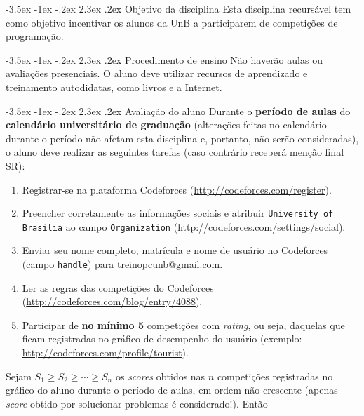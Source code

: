 \documentclass{UnBExam}%
\makeatletter
\newcommand{\numerocontests}{5}
\renewcommand\section{\@startsection{section}{1}{\z@}%
	{-3.5ex \@plus -1ex \@minus -.2ex}%
	{2.3ex \@plus.2ex}%
	{\normalfont\normalsize\bfseries}}%
\renewcommand{\indent}{\hspace{.5cm}}
\makeatother
\begin{document}
\section{Objetivo da disciplina}
\indent Esta disciplina recursável tem como objetivo incentivar os alunos da UnB a participarem de competições de programação.

\vspace{-.1cm}
\section{Procedimento de ensino}
\indent Não haverão aulas ou avaliações presenciais. O aluno deve utilizar recursos de aprendizado e treinamento autodidatas, como livros \cite{halim2013competitive,cormen2009introduction} e a Internet.

\vspace{-.1cm}
\section{Avaliação do aluno}
\indent Durante o \textbf{período de aulas} do \textbf{calendário universitário de graduação} (alterações feitas no calendário durante o período não afetam esta disciplina e, portanto, não serão consideradas), o aluno deve realizar as seguintes tarefas (caso contrário receberá menção final SR):
\begin{enumerate}
	\item Registrar-se na plataforma Codeforces (\url{http://codeforces.com/register}).
	\item Preencher corretamente as informações sociais e atribuir \texttt{University of Brasilia} ao campo \texttt{Organization} (\url{http://codeforces.com/settings/social}).
	\item Enviar seu nome completo, matrícula e nome de usuário no Codeforces (campo \texttt{handle}) para \url{treinopcunb@gmail.com}.
	\item Ler as regras das competições do Codeforces (\url{http://codeforces.com/blog/entry/4088}).
	\item Participar de \textbf{no mínimo \numerocontests} competições com \textit{rating}, ou seja, daquelas que ficam registradas no gráfico de desempenho do usuário (exemplo: \url{http://codeforces.com/profile/tourist}).
\end{enumerate}
\indent Sejam $S_1 \geq S_2 \geq \cdots \geq S_n$ os \textit{scores} obtidos nas $n$ competições registradas no gráfico do aluno durante o período de aulas, em ordem não-crescente (apenas \textit{score} obtido por solucionar problemas é considerado!). Então
\end{document}
